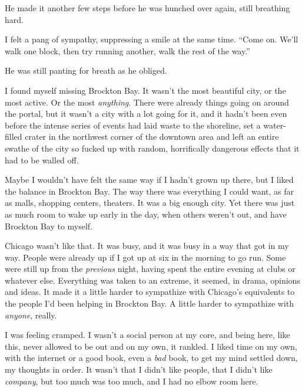 He made it another few steps before he was hunched over again, still breathing hard.



I felt a pang of sympathy, suppressing a smile at the same time.  ``Come on.  We'll walk one block, then try running another, walk the rest of the way.''



He was still panting for breath as he obliged.



I found myself missing Brockton Bay.  It wasn't the most beautiful city, or the most active.  Or the most \emph{anything}.  There were already things going on around the portal, but it wasn't a city with a lot going for it, and it hadn't been even before the intense series of events had laid waste to the shoreline, set a water-filled crater in the northwest corner of the downtown area and left an entire swathe of the city so fucked up with random, horrifically dangerous effects that it had to be walled off.



Maybe I wouldn't have felt the same way if I hadn't grown up there, but I liked the balance in Brockton Bay.  The way there was everything I could want, as far as malls, shopping centers, theaters.  It was a big enough city.  Yet there was just as much room to wake up early in the day, when others weren't out, and have Brockton Bay to myself.



Chicago wasn't like that.  It was busy, and it was busy in a way that got in my way.  People were already up if I got up at six in the morning to go run.  Some were still up from the \emph{previous} night, having spent the entire evening at clubs or whatever else.  Everything was taken to an extreme, it seemed, in drama, opinions and ideas.  It made it a little harder to sympathize with Chicago's equivalents to the people I'd been helping in Brockton Bay.  A little harder to sympathize with \emph{anyone}, really.



I was feeling cramped.  I wasn't a social person at my core, and being here, like this, never allowed to be out and on my own, it rankled.  I liked time on my own, with the internet or a good book, even a \emph{bad} book, to get my mind settled down, my thoughts in order.  It wasn't that I didn't like people, that I didn't like \emph{company}, but too much was too much, and I had no elbow room here.



